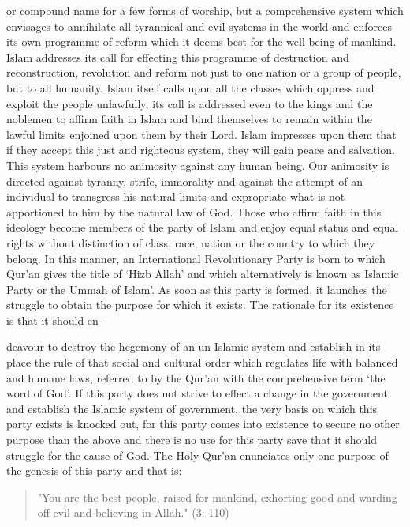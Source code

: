 or compound name for a few forms of worship, but a comprehensive system
which envisages to annihilate all tyrannical and evil systems in the
world and enforces its own programme of reform which it deems best for
the well-being of mankind. Islam addresses its call for effecting this
programme of destruction and reconstruction, revolution and reform not
just to one nation or a group of people, but to all humanity. Islam
itself calls upon all the classes which oppress and exploit the people
unlawfully, its call is addressed even to the kings and the noblemen to
affirm faith in Islam and bind themselves to remain within the lawful
limits enjoined upon them by their Lord. Islam impresses upon them that
if they accept this just and righteous system, they will gain peace and
salvation. This system harbours no animosity against any human being.
Our animosity is directed against tyranny, strife, immorality and
against the attempt of an individual to transgress his natural limits
and expropriate what is not apportioned to him by the natural law of
God. Those who affirm faith in this ideology become members of the party
of Islam and enjoy equal status and equal rights without distinction of
class, race, nation or the country to which they belong. In this manner,
an International Revolutionary Party is born to which Qur'an gives the
title of `Hizb Allah' and which alternatively is known as Islamic Party
or the Ummah of Islam'. As soon as this party is formed, it launches the
struggle to obtain the purpose for which it exists. The rationale for
its existence is that it should en-

deavour to destroy the hegemony of an un-Islamic system and establish in
its place the rule of that social and cultural order which regulates
life with balanced and humane laws, referred to by the Qur'an with the
comprehensive term `the word of God'. If this party does not strive to
effect a change in the government and establish the Islamic system of
government, the very basis on which this party exists is knocked out,
for this party comes into existence to secure no other purpose than the
above and there is no use for this party save that it should struggle
for the cause of God. The Holy Qur'an enunciates only one purpose of the
genesis of this party and that is:

\begin{quote}
"You are the best people, raised for mankind, exhorting good and warding
off evil and believing in Allah." (3: 110)
\end{quote}

